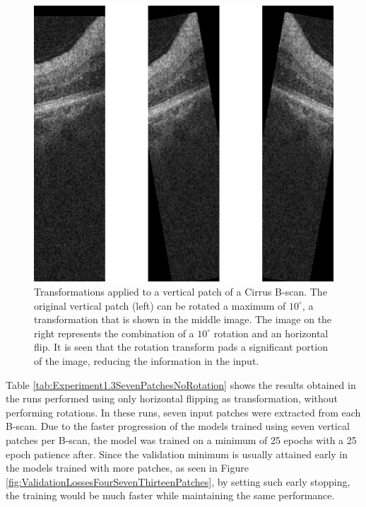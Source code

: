 \begin{figure}[!ht]
	\centering
	\includegraphics[width=0.5\linewidth]{figures/TransformationsInVerticalPatches.png}
	\caption{Transformations applied to a vertical patch of a Cirrus B-scan. The original vertical patch (left) can be rotated a maximum of $10^{\circ}$, a transformation that is shown in the middle image. The image on the right represents the combination of a $10^{\circ}$ rotation and an horizontal flip. It is seen that the rotation transform pads a significant portion of the image, reducing the information in the input.}
	\label{fig:TransformationsInVerticalPatches}
\end{figure}

Table \ref{tab:Experiment1.3SevenPatchesNoRotation} shows the results obtained in the runs performed using only horizontal flipping as transformation, without performing rotations. In these runs, seven input patches were extracted from each B-scan. Due to the faster progression of the models trained using seven vertical patches per B-scan, the model was trained on a minimum of 25 epochs with a 25 epoch patience after. Since the validation minimum is usually attained early in the models trained with more patches, as seen in Figure \ref{fig:ValidationLossesFourSevenThirteenPatches}, by setting such early stopping, the training would be much faster while maintaining the same performance.

